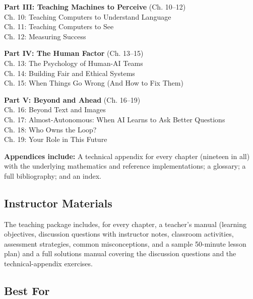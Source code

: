 \documentclass[12pt, a4paper]{article}
\begin{document}
\begin{tcolorbox}[editionbox=textbookteal, title=Winter Edition \textbullet\ Academic Course Edition]
\begin{minipage}[t]{0.47\textwidth}
\vspace{8pt}
\textbf{Part III: Teaching Machines to Perceive} (Ch. 10--12)\\
{\small
Ch. 10: Teaching Computers to Understand Language\\
Ch. 11: Teaching Computers to See\\
Ch. 12: Measuring Success\\
}
\end{minipage}%
\hfill
\begin{minipage}[t]{0.47\textwidth}
\textbf{Part IV: The Human Factor} (Ch. 13--15)\\
{\small
Ch. 13: The Psychology of Human-AI Teams\\
Ch. 14: Building Fair and Ethical Systems\\
Ch. 15: When Things Go Wrong (And How to Fix Them)\\
}

\vspace{8pt}
\textbf{Part V: Beyond and Ahead} (Ch. 16--19)\\
{\small
Ch. 16: Beyond Text and Images\\
Ch. 17: Almost-Autonomous: When AI Learns to Ask Better Questions\\
Ch. 18: Who Owns the Loop?\\
Ch. 19: Your Role in This Future\\
}
\end{minipage}

\vspace{10pt}

\textbf{Appendices include:} A technical appendix for every chapter (nineteen in all) with the underlying mathematics and reference implementations; a glossary; a full bibliography; and an index.

\subsection*{\color{charcoal} Instructor Materials}

The teaching package includes, for every chapter, a teacher's manual (learning objectives, discussion questions with instructor notes, classroom activities, assessment strategies, common misconceptions, and a sample 50-minute lesson plan) and a full solutions manual covering the discussion questions and the technical-appendix exercises.

\subsection*{\color{charcoal} Best For}


\end{tcolorbox}
\end{document}

